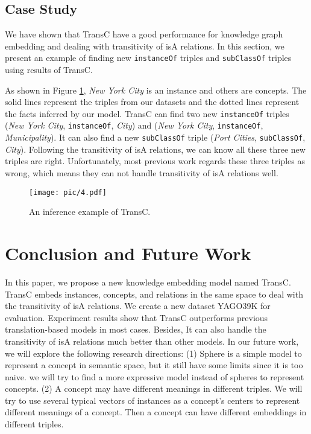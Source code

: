 \documentclass[11pt,a4paper]{article}
\begin{document}
  \subsection{Case Study}
  
  We have shown that TransC have a good performance for knowledge graph embedding and dealing with transitivity of isA relations.
  In this section, we present an example of finding new \texttt{instanceOf} triples and \texttt{subClassOf} triples using results of TransC.
  
  As shown in Figure \ref{fig3}, \textit{New York City} is an instance and others are concepts. 
  The solid lines represent the triples from our datasets and the dotted lines represent the facts 
  inferred by our model. TransC can find two new \texttt{instanceOf} triples (\textit{New York City}, \texttt{instanceOf}, \textit{City}) and
  (\textit{New York City}, \texttt{instanceOf}, \textit{Municipality}). It can also find a new \texttt{subClassOf} triple (\textit{Port Cities}, \texttt{subClassOf}, \textit{City}).
  Following the transitivity of isA relations, we can know all these three new triples are right.
  Unfortunately, most previous work regards these three triples as wrong, which means they can not handle transitivity of isA relations well.
  
  \begin{figure}[ht]
    \centering
    \setlength{\abovecaptionskip}{2pt}
    \setlength{\belowcaptionskip}{0pt}
    \texttt{[image: pic/4.pdf]}\\
    \caption{An inference example of TransC.}
    \label{fig3}
    \end{figure} 
  
  \section{Conclusion and Future Work}
  
  In this paper, we propose a new knowledge embedding model named TransC. TransC embeds instances, concepts, and relations in the same space
  to deal with the transitivity of isA relations. We create a new dataset YAGO39K for evaluation. Experiment results show that 
  TransC outperforms previous translation-based models in most cases. Besides, It can also handle the transitivity of isA relations
  much better than other models. In our future work, we will explore the following research directions:
  (1) Sphere is a simple model to represent a concept in semantic space, but it still have some limits since it is too naive.
  we will try to find a more expressive model instead of spheres to represent concepts. (2) A concept may have 
  different meanings in different triples. We will try to use several typical vectors of instances as a concept's centers
  to represent different meanings of a concept. Then a concept can have different embeddings in different triples.
  
\end{document}
